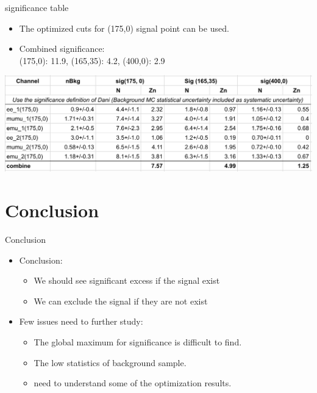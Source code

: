 \documentclass[mathserif,serif]{beamer}
\begin{document}
\begin{frame}{significance table}
\begin{itemize}
\item The optimized cuts for (175,0) signal point can be used.
\item Combined significance: \\
(175,0): 11.9, (165,35): 4.2, (400,0): 2.9
\end{itemize}
\includegraphics[width=\textwidth]{data/optimization/dongliang.png}
\end{frame}



\section{Conclusion}
\begin{frame}{Conclusion}
\begin{itemize}
\item Conclusion:
\begin{itemize}
\item We should see significant excess if the signal exist
\item We can exclude the signal if they are not exist
\end{itemize}
\item Few issues need to further study:
\begin{itemize}
\item The global maximum for significance is difficult to find.
\item The low statistics of background sample.
\item need to understand some of the optimization results.
\end{itemize}
\end{itemize}
\end{frame}
\end{document}
